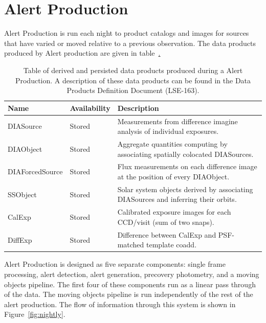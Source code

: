 \section{Alert Production}
\label{sec:ap}



Alert Production is run each night to product catalogs and images for sources that have varied or moved relative to a previous observation.  The data products produced by Alert production are given in table~\hyperref[table:ap_data_products].

\begin{table}
\small
\begin{tabularx}{\textwidth}{ | l | l | X | }
  \hline
  {\bf Name} & {\bf Availability} & {\bf Description} \\
  \hline
  DIASource & Stored &
  Measurements from difference imagine analysis of individual exposures. \\
  \hline
  DIAObject& Stored &
  Aggregate quantities computing by associating spatially colocated DIASources. \\
  \hline
  DIAForcedSource & Stored &
  Flux measurements on each difference image at the position of every DIAObject. \\
  \hline
  SSObject & Stored &
  Solar system objects derived by associating DIASources and inferring their orbits. \\
  \hline
  CalExp & Stored &
  Calibrated exposure images for each CCD/visit (sum of two snaps). \\
  \hline
  DiffExp & Stored &
  Difference between CalExp and PSF-matched template coadd. \\
  \hline
\end{tabularx}
\caption{Table of derived and persisted data products produced during a Alert Production.  A description of these data products can be found in the Data Products Definition Document (LSE-163).
\label{table:ap_data_products}}
\end{table}


Alert Production is designed as five separate components: single frame
processing, alert detection, alert generation, precovery photometry,
and a moving objects pipeline. The first four of these components run
as a linear pass through of the data. The moving objects pipeline is
run independently of the rest of the alert production. The flow of
information through this system is shown in Figure~\ref{fig:nightly}.

